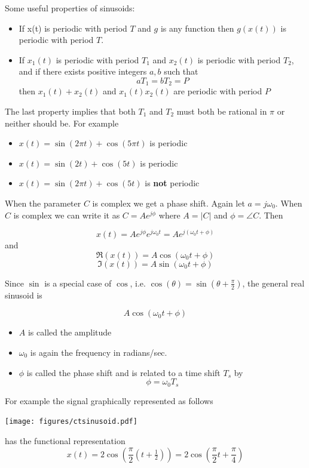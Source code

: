 Some useful properties of sinusoids:

\begin{itemize}
\item If x(t) is periodic with period $T$ and $g$ is any function then $g(x(t))$ is periodic with period $T$.
\item If $x_1(t)$ is periodic with period $T_1$ and $x_2(t)$ is periodic with period $T_2$, and if there exists positive integers $a,b$ such that
  \[
  aT_1 = b T_2 = P
  \]
  then $x_1(t) + x_2(t)$ and $x_1(t)x_2(t)$ are periodic with period $P$
\end{itemize}
The last property implies that both $T_1$ and $T_2$ must both be rational in $\pi$ or neither should be. For example

\begin{itemize}
\item $x(t) = \sin(2\pi t) + \cos(5\pi t)$ is periodic
\item $x(t) = \sin(2 t) + \cos(5 t)$ is periodic
\item $x(t) = \sin(2\pi t) + \cos(5 t)$ is {\bf not} periodic
\end{itemize}

When the parameter $C$ is complex we get a phase shift. Again let $a = j\omega_0$. When $C$ is complex we can write it as $C = Ae^{j\phi}$ where $A = |C|$ and $\phi = \angle C$. Then

\[
x(t) = Ae^{j\phi} e^{j\omega_0 t} = Ae^{j(\omega_0 t+\phi)} 
\]
and
\[
\Re(x(t)) = A\cos(\omega_0 t+\phi) 
\]
\[
\Im(x(t)) = A\sin(\omega_0 t+\phi) 
\]

Since $\sin$ is a special case of $\cos$, i.e. $\cos(\theta) = \sin(\theta + \frac{\pi}{2})$, the general real sinusoid is

\[
A\cos(\omega_0 t + \phi)
\]
  
\begin{itemize}
\item $A$ is called the amplitude
\item $\omega_0$ is again the frequency in radians/sec.
\item $\phi$ is called the phase shift and is related to a time shift $T_s$ by
  \[
  \phi = \omega_0T_s
  \]
\end{itemize}

For example the signal graphically represented as follows
\begin{center}
  \texttt{[image: figures/ctsinusoid.pdf]}
\end{center}
has the functional representation
\[
x(t) = 2\cos\left(\frac{\pi}{2} (t+\tfrac{1}{2}) \right) =  2\cos\left(\frac{\pi}{2} t +\frac{\pi}{4} \right)
\]

